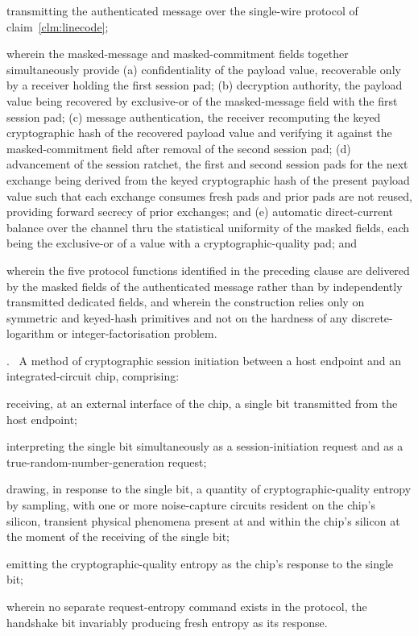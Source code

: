 \documentclass[12pt,letterpaper]{article}
\newcounter{para}
\newcounter{claim}
\newcommand{\claim}[1]{\medskip\par\refstepcounter{claim}\noindent\arabic{claim}.~\label{clm:#1}\ignorespaces}
\newcommand{\clm}[1]{claim~\ref{clm:#1}}
\begin{document}
transmitting the authenticated message over the single-wire protocol of \clm{linecode};

wherein the masked-message and masked-commitment fields together simultaneously provide (a) confidentiality of the payload value, recoverable only by a receiver holding the first session pad; (b) decryption authority, the payload value being recovered by exclusive-or of the masked-message field with the first session pad; (c) message authentication, the receiver recomputing the keyed cryptographic hash of the recovered payload value and verifying it against the masked-commitment field after removal of the second session pad; (d) advancement of the session ratchet, the first and second session pads for the next exchange being derived from the keyed cryptographic hash of the present payload value such that each exchange consumes fresh pads and prior pads are not reused, providing forward secrecy of prior exchanges; and (e) automatic direct-current balance over the channel thru the statistical uniformity of the masked fields, each being the exclusive-or of a value with a cryptographic-quality pad; and

wherein the five protocol functions identified in the preceding clause are delivered by the masked fields of the authenticated message rather than by independently transmitted dedicated fields, and wherein the construction relies only on symmetric and keyed-hash primitives and not on the hardness of any discrete-logarithm or integer-factorisation problem.

\claim{handshake} A method of cryptographic session initiation between a host endpoint and an integrated-circuit chip, comprising:

receiving, at an external interface of the chip, a single bit transmitted from the host endpoint;

interpreting the single bit simultaneously as a session-initiation request and as a true-random-number-generation request;

drawing, in response to the single bit, a quantity of cryptographic-quality entropy by sampling, with one or more noise-capture circuits resident on the chip's silicon, transient physical phenomena present at and within the chip's silicon at the moment of the receiving of the single bit;

emitting the cryptographic-quality entropy as the chip's response to the single bit;

wherein no separate request-entropy command exists in the protocol, the handshake bit invariably producing fresh entropy as its response.
\end{document}

